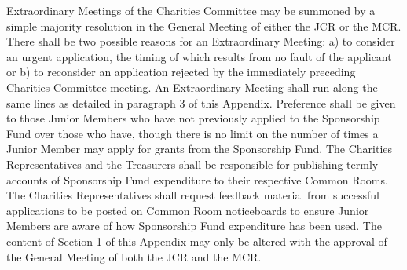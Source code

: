\appnpara Extraordinary Meetings of the Charities Committee may be summoned by a simple majority resolution in the General Meeting of either the JCR or the MCR. There shall be two possible reasons for an Extraordinary Meeting: a) to consider an urgent application, the timing of which results from no fault of the applicant or b) to reconsider an application rejected by the immediately preceding Charities Committee meeting. An Extraordinary Meeting shall run along the same lines as detailed in paragraph 3 of this Appendix.
\appnpara Preference shall be given to those Junior Members who have not previously applied to the Sponsorship Fund over those who have, though there is no limit on the number of times a Junior Member may apply for grants from the Sponsorship Fund.
\appnpara The Charities Representatives and the Treasurers shall be responsible for publishing termly accounts of Sponsorship Fund expenditure to their respective Common Rooms.  The Charities Representatives shall request feedback material from successful applications to be posted on Common Room noticeboards to ensure Junior Members are aware of how Sponsorship Fund expenditure has been used.
\appnpara The content of Section 1 of this Appendix may only be altered with the approval of the General Meeting of both the JCR and the MCR.

